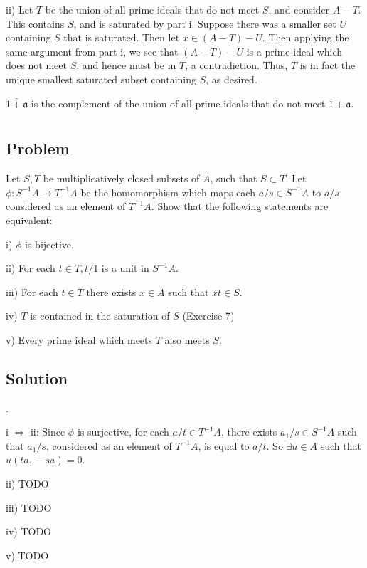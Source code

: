 \documentclass[book,12pt,oneside,openany]{memoir}
\begin{document}
ii) Let $T$ be the union of all prime ideals that do not meet $S$, and consider $A-T$. This contains $S$, and is saturated by part i. Suppose there was a smaller set $U$ containing $S$ that is saturated. Then let $x \in (A-T) - U$. Then applying the same argument from part i, we see that $(A-T) - U$ is a prime ideal which does not meet $S$, and hence must be in $T$, a contradiction. Thus, $T$ is in fact the unique smallest saturated subset containing $S$, as desired.

$\bar{1 + \mathfrak{a}}$ is the complement of the union of all prime ideals that do not meet $1 + \mathfrak{a}$.

\section{}
\subsection{Problem}
Let $S,T$ be multiplicatively closed subsets of $A$, such that $S \subset T$. Let $\phi: S^{-1}A \rightarrow T^{-1}A$ be the homomorphism which maps each $a/s \in S^{-1}A$ to $a/s$ considered as an element of $T^{-1}A$. Show that the following statements are equivalent:

i) $\phi$ is bijective.

ii) For each $t \in T, t/1$ is a unit in $S^{-1}A$.

iii) For each $t \in T$ there exists $x \in A$ such that $xt \in S$.

iv) $T$ is contained in the saturation of $S$ (Exercise 7)

v) Every prime ideal which meets $T$ also meets $S$.

\subsection{Solution}
.

i $\Rightarrow$ ii: Since $\phi$ is surjective, for each $a/t \in T^{-1}A$, there exists $a_1/s \in S^{-1}A$ such that $a_1/s$, considered as an element of $T^{-1}A$, is equal to $a/t$. So $\exists u \in A$ such that $u(ta_1 - sa) = 0$.

ii) TODO

iii) TODO

iv) TODO

v) TODO
\end{document}
